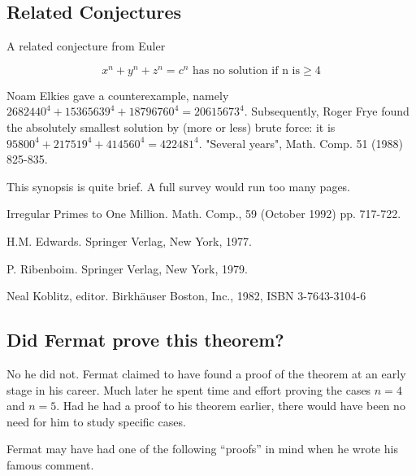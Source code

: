 \subsection{Related Conjectures}

 A related conjecture from Euler

\[ x^n + y^n + z^n = c^n \mbox{ has no solution if n is} \geq 4 \]

Noam Elkies gave a counterexample, namely $2682440^4 + 15365639^4 +
18796760^4 = 20615673^4$. Subsequently, Roger Frye found the
absolutely smallest solution by (more or less) brute force: it is
$95800^4 + 217519^4 + 414560^4 = 422481^4$.  "Several years",
Math. Comp. 51 (1988) 825-835.
 

   This synopsis is quite brief. A full survey would run too many pages.

    \Ref

            {Irregular Primes to One Million.}
            {Math. Comp.,}
            {59 (October 1992) pp. 717-722.}

         {H.M. Edwards.}
         {Springer Verlag, New York, 1977.}

         {P. Ribenboim.}
         {Springer Verlag, New York, 1979.}

         {Neal Koblitz, editor.}
         {Birkh\"auser Boston, Inc., 1982, ISBN 3-7643-3104-6}





\subsection{Did Fermat prove this theorem?}


No he did not. Fermat claimed to have found a proof of the theorem
at an early stage in his career. Much later he spent time and effort
proving the cases $n=4$ and $n=5$. Had he had a proof to his theorem 
earlier, there would have been no need for him to study specific cases.

Fermat may have had one of the following ``proofs'' in mind when
he wrote his famous comment.

